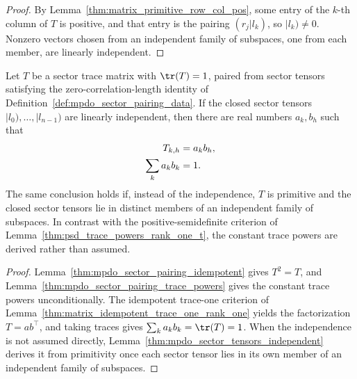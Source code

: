 \begin{proof}
    \leanok
    By Lemma~\ref{thm:matrix_primitive_row_col_pos}, some entry of the
    $k$-th column of $T$ is positive, and that entry is the pairing
    $(r_j|l_k)$, so $|l_k)\neq0$. Nonzero vectors chosen from an independent
    family of subspaces, one from each member, are linearly independent.
\end{proof}

\begin{lemma}
    \label{thm:pairing_idempotent_rank_one_t}
    \leanok
    Let $T$ be a sector trace matrix with $\tr(T)=1$, paired
    from sector tensors satisfying the zero-correlation-length identity of
    Definition~\ref{def:mpdo_sector_pairing_data}. If the closed sector
    tensors $|l_0),\ldots,|l_{n-1})$ are linearly independent, then there are
    real numbers $a_k,b_h$ such that
    \begin{align}
        T_{k,h}       & =a_kb_h,
        \notag                   \\
        \sum_k a_kb_k & =1.
        \notag
    \end{align}
    The same conclusion holds if, instead of the independence, $T$ is
    primitive and the closed sector tensors lie in distinct members of an
    independent family of subspaces. In contrast with the
    positive-semidefinite criterion of
    Lemma~\ref{thm:psd_trace_powers_rank_one_t}, the constant trace powers
    are derived rather than assumed.
\end{lemma}

\begin{proof}
    \leanok
    Lemma~\ref{thm:mpdo_sector_pairing_idempotent} gives $T^2=T$, and
    Lemma~\ref{thm:mpdo_sector_pairing_trace_powers} gives the constant
    trace powers unconditionally. The idempotent trace-one criterion of
    Lemma~\ref{thm:matrix_idempotent_trace_one_rank_one} yields the
    factorization $T=ab^\top$, and taking traces gives
    $\sum_k a_kb_k=\tr(T)=1$. When the independence is not
    assumed directly, Lemma~\ref{thm:mpdo_sector_tensors_independent}
    derives it from primitivity once each sector tensor lies in its own member
    of an independent family of subspaces.
\end{proof}
